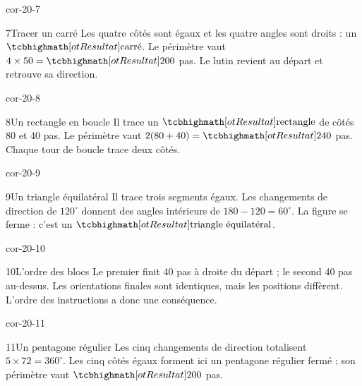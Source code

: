 \begin{blocLivre}{cor-20-7}\begin{corrige}{7}{Tracer un carré}
Les quatre côtés sont égaux et les quatre angles sont droits : un $\res{\text{carré}}$. Le périmètre vaut $4\times50=\res{200}$ pas. Le lutin revient au départ et retrouve sa direction.
\label{fig-cor-20-7}
\end{corrige}\end{blocLivre}
\begin{blocLivre}{cor-20-8}\begin{corrige}{8}{Un rectangle en boucle}
Il trace un $\res{\text{rectangle}}$ de côtés 80 et 40 pas. Le périmètre vaut $2(80+40)=\res{240}$ pas. Chaque tour de boucle trace deux côtés.
\label{fig-cor-20-8}
\end{corrige}\end{blocLivre}
\begin{blocLivre}{cor-20-9}\begin{corrige}{9}{Un triangle équilatéral}
Il trace trois segments égaux. Les changements de direction de $120^\circ$ donnent des angles intérieurs de $180-120=60^\circ$. La figure se ferme : c’est un $\res{\text{triangle équilatéral}}$.
\label{fig-cor-20-9}
\end{corrige}\end{blocLivre}
\begin{blocLivre}{cor-20-10}\begin{corrige}{10}{L’ordre des blocs}
Le premier finit 40 pas à droite du départ ; le second 40 pas au-dessus. Les orientations finales sont identiques, mais les positions diffèrent. L’ordre des instructions a donc une conséquence.
\label{fig-cor-20-10}
\end{corrige}\end{blocLivre}
\begin{blocLivre}{cor-20-11}\begin{corrige}{11}{Un pentagone régulier}
Les cinq changements de direction totalisent $5\times72=360^\circ$. Les cinq côtés égaux forment ici un pentagone régulier fermé ; son périmètre vaut $\res{200}$ pas.
\label{fig-cor-20-11}
\end{corrige}\end{blocLivre}
